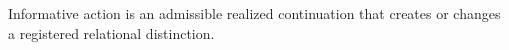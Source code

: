 \setcounter{theorem}{0}
\begin{definition}
Informative action is an admissible realized continuation that creates or changes a registered relational distinction.
\end{definition}
